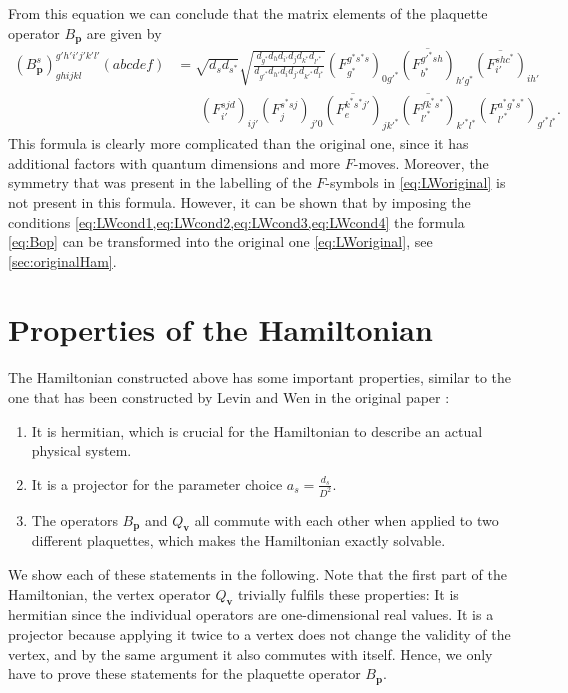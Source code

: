 From this equation we can conclude that the matrix elements of the plaquette operator $B_\mathbf{p}$ are given by
	\begin{align}
		\left(B_{\mathbf{p}}^s\right)_{ghijkl}^{g'h'i'j'k'l'}(abcdef)&=\sqrt{d_s d_{s^*}} \sqrt{\frac{d_{g^*} d_h d_{i'} d_j d_{k^*} d_{l'^*}}{d_{g'^*} d_{h'} d_i d_{j'} d_{k'^*} d_{l^*}}}\left(F_{g^*}^{g^*s^* s}\right)_{0g'^*}\overline{\left(F_{b^*}^{g'^*sh}\right)}_{h' g^*}\overline{\left(F_{i'}^{shc^*}\right)}_{ih'}\\&\hspace{20pt}\left(F_{i'}^{sjd}\right)_{ij'}\left(F_j^{s^*sj}\right)_{j' 0} \overline{\left(F_e^{k^*s^*j'}\right)}_{j k'^*} \overline{\left(F_{l'^*}^{fk^*s^*}\right)}_{k'^*l^*}\left(F_{l'^*}^{a^*g^*s^*}\right)_{g'^*l^*}.\label{eq:Bop}
	\end{align}
This formula is clearly more complicated than the original one, since it has additional factors with quantum dimensions and more $F$-moves. Moreover, the symmetry that was present in the labelling of the $F$-symbols in \cref{eq:LWoriginal} is not present in this formula. However, it can be shown that by imposing the conditions \cref{eq:LWcond1,eq:LWcond2,eq:LWcond3,eq:LWcond4} the formula \cref{eq:Bop} can be transformed into the original one \cref{eq:LWoriginal}, see \cref{sec:originalHam}.

\section{Properties of the Hamiltonian}

The Hamiltonian constructed above has some important properties, similar to the one that has been constructed by Levin and Wen in the original paper \cite{Levin2005}:
	\begin{enumerate}
		\item It is hermitian, which is crucial for the Hamiltonian to describe an actual physical system.
		\item It is a projector for the parameter choice $a_s=\frac{d_s}{D^2}$.
		\item The operators $B_\mathbf{p}$ and $Q_\mathbf{v}$ all commute with each other when applied to two different plaquettes, which makes the Hamiltonian exactly solvable.
	\end{enumerate}
We show each of these statements in the following. Note that the first part of the Hamiltonian, the vertex operator $Q_\mathbf{v}$ trivially fulfils these properties: It is hermitian since the individual operators are one-dimensional real values. It is a projector because applying it twice to a vertex does not change the validity of the vertex, and by the same argument it also commutes with itself. Hence, we only have to prove these statements for the plaquette operator $B_\mathbf{p}$.

